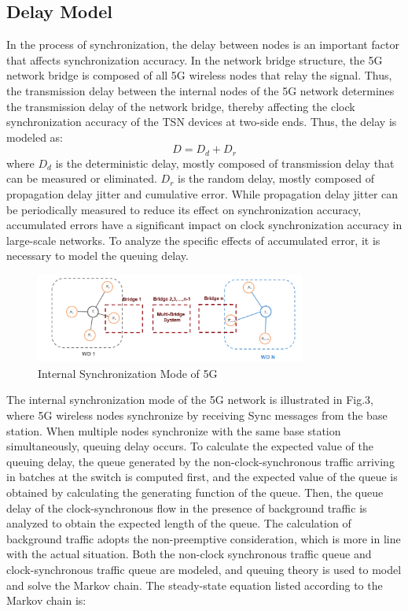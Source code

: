 \documentclass[english]{cccconf}
\begin{document}
\subsection{Delay Model}
In the process of synchronization, the delay between nodes is an important factor that affects synchronization accuracy. In the network bridge structure, the 5G network bridge is composed of all 5G wireless nodes that relay the signal. Thus, the transmission delay between the internal nodes of the 5G network determines the transmission delay of the network bridge, thereby affecting the clock synchronization accuracy of the TSN devices at two-side ends. Thus, the delay is modeled as:
\begin{equation}
	D=D_d+D_r
\end{equation}
where $D_d$ is the deterministic delay, mostly composed of transmission delay that can be measured or eliminated. $D_r$ is the random delay, mostly composed of propagation delay jitter and cumulative error. While propagation delay jitter can be periodically measured to reduce its effect on synchronization accuracy\cite{9064350}, accumulated errors have a significant impact on clock synchronization accuracy in large-scale networks. To analyze the specific effects of accumulated error, it is necessary to model the queuing delay.
\begin{figure}[htbp]
	\centering
	\setcounter{figure}{2}
	\includegraphics[width=3.5in]{fig21.png}
	\caption{Internal Synchronization Mode of 5G }
\end{figure}
The internal synchronization mode of the 5G network is illustrated in Fig.3, where 5G wireless nodes synchronize by receiving Sync messages from the base station. When multiple nodes synchronize with the same base station simultaneously, queuing delay occurs. To calculate the expected value of the queuing delay, the queue generated by the non-clock-synchronous traffic arriving in batches at the switch is computed first, and the expected value of the queue is obtained by calculating the generating function of the queue. Then, the queue delay of the clock-synchronous flow in the presence of background traffic is analyzed to obtain the expected length of the queue. The calculation of background traffic adopts the non-preemptive consideration, which is more in line with the actual situation. Both the non-clock synchronous traffic queue and clock-synchronous traffic queue are modeled, and queuing theory is used to model and solve the Markov chain. The steady-state equation listed according to the Markov chain is:
\end{document}

